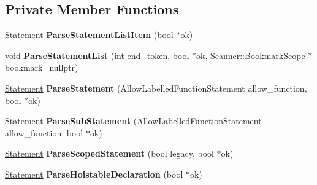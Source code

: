 \subsection*{Private Member Functions}
\begin{DoxyCompactItemize}
\item 
\hyperlink{classv8_1_1internal_1_1_pre_parser_statement}{Statement} {\bfseries Parse\+Statement\+List\+Item} (bool $\ast$ok)\hypertarget{classv8_1_1internal_1_1_pre_parser_ab4b72f6fd7f40b7e20e04e8290aefeae}{}\label{classv8_1_1internal_1_1_pre_parser_ab4b72f6fd7f40b7e20e04e8290aefeae}

\item 
void {\bfseries Parse\+Statement\+List} (int end\+\_\+token, bool $\ast$ok, \hyperlink{classv8_1_1internal_1_1_scanner_1_1_bookmark_scope}{Scanner\+::\+Bookmark\+Scope} $\ast$bookmark=nullptr)\hypertarget{classv8_1_1internal_1_1_pre_parser_ac098aed50474de7fdf0c746d6d9f6f5b}{}\label{classv8_1_1internal_1_1_pre_parser_ac098aed50474de7fdf0c746d6d9f6f5b}

\item 
\hyperlink{classv8_1_1internal_1_1_pre_parser_statement}{Statement} {\bfseries Parse\+Statement} (Allow\+Labelled\+Function\+Statement allow\+\_\+function, bool $\ast$ok)\hypertarget{classv8_1_1internal_1_1_pre_parser_a56fc94c6312751794a3356d4f040d542}{}\label{classv8_1_1internal_1_1_pre_parser_a56fc94c6312751794a3356d4f040d542}

\item 
\hyperlink{classv8_1_1internal_1_1_pre_parser_statement}{Statement} {\bfseries Parse\+Sub\+Statement} (Allow\+Labelled\+Function\+Statement allow\+\_\+function, bool $\ast$ok)\hypertarget{classv8_1_1internal_1_1_pre_parser_a92c2d9788998304f0ec725930898db55}{}\label{classv8_1_1internal_1_1_pre_parser_a92c2d9788998304f0ec725930898db55}

\item 
\hyperlink{classv8_1_1internal_1_1_pre_parser_statement}{Statement} {\bfseries Parse\+Scoped\+Statement} (bool legacy, bool $\ast$ok)\hypertarget{classv8_1_1internal_1_1_pre_parser_a7b2ef01206b075d65fe1dd9a9616ddcf}{}\label{classv8_1_1internal_1_1_pre_parser_a7b2ef01206b075d65fe1dd9a9616ddcf}

\item 
\hyperlink{classv8_1_1internal_1_1_pre_parser_statement}{Statement} {\bfseries Parse\+Hoistable\+Declaration} (bool $\ast$ok)\hypertarget{classv8_1_1internal_1_1_pre_parser_a6222c2d87be804fb5b6fbeecf0db0066}{}\label{classv8_1_1internal_1_1_pre_parser_a6222c2d87be804fb5b6fbeecf0db0066}


\end{DoxyCompactItemize}
